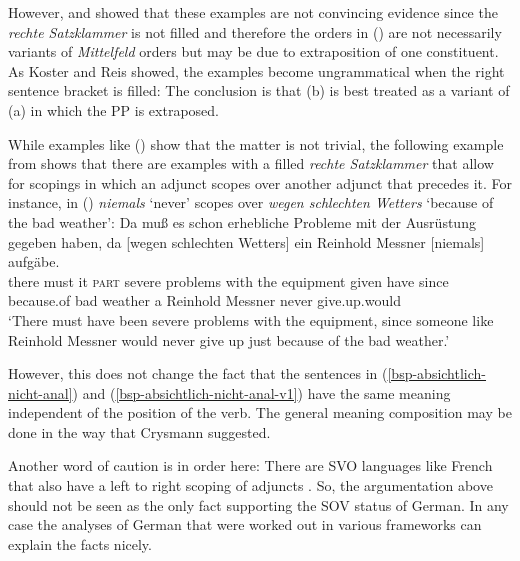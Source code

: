   However, \citet[Section~6]{Koster75a} and \citet*[]{Reis80a} showed that these examples
  are not convincing evidence since the \emph{rechte Satzklammer} is not filled and therefore the
  orders in () are not necessarily variants of \emph{Mittelfeld} orders but may be due to extraposition of
  one constituent. As Koster and Reis showed, the examples become ungrammatical when the right sentence
  bracket is filled:
\eal
{}
\zl
The conclusion is that (b) is best treated as a variant of (a) in which the PP is extraposed.

While examples like () show that the matter is not trivial, the following example from \citet[]{Crysmann2004a} shows that there are examples with a filled \emph{rechte Satzklammer} that allow
for scopings in which an adjunct scopes over another adjunct that precedes it. For instance, in
() \emph{niemals} `never' scopes over \emph{wegen schlechten Wetters} `because of the bad weather':
\ea
\gll Da muß es schon erhebliche Probleme mit der Ausrüstung gegeben haben, da [wegen
  schlechten  Wetters] ein Reinhold Messner [niemals] aufgäbe.\\
     there must it \textsc{part} severe problems with the equipment given have since \hspaceThis{[}because.of bad weather a Reinhold Messner \hspaceThis{[}never give.up.would\\
\glt `There must have been severe problems with the equipment, since someone like Reinhold Messner
would never give up just because of the bad weather.'
\z

However, this does not change the fact that the sentences in (\ref{bsp-absichtlich-nicht-anal}) and
(\ref{bsp-absichtlich-nicht-anal-v1}) have the same meaning independent of the position of the
verb. The general meaning composition may be done in the way that Crysmann suggested.%
%

Another word of caution is in order here: There are SVO languages like French that also have a left
to right scoping of adjuncts \citep[--161]{BGK2004a-u}. So, the argumentation above should not be seen as the only
fact supporting the SOV status of German. In any case the analyses of German that were
worked out in various frameworks can explain the facts nicely.



